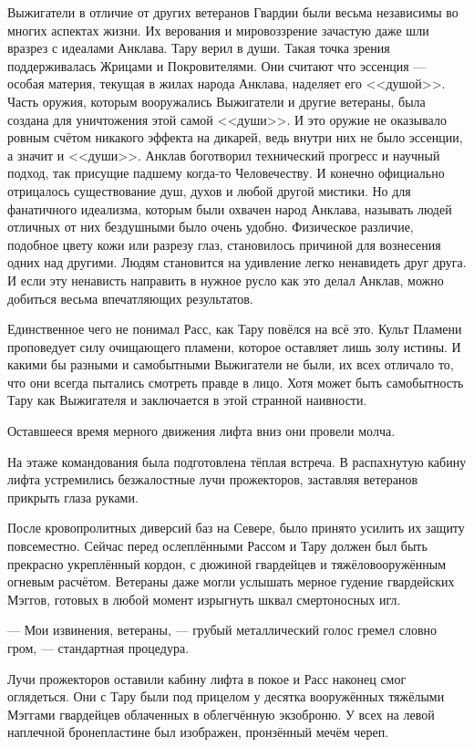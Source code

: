 Выжигатели в отличие от других ветеранов Гвардии были весьма независимы во 
многих аспектах жизни. Их верования и мировоззрение зачастую даже шли вразрез с 
идеалами Анклава. Тару верил в души. Такая точка зрения поддерживалась Жрицами и 
Покровителями. Они считают что эссенция --- особая материя, текущая в жилах 
народа Анклава, наделяет его <<душой>>. Часть оружия, которым вооружались 
Выжигатели и другие ветераны, была создана для уничтожения этой самой <<души>>. 
И это оружие не оказывало ровным счётом никакого эффекта на дикарей, ведь 
внутри них не было эссенции, а значит и <<души>>. Анклав боготворил технический 
прогресс и научный подход, так присущие падшему когда-то Человечеству. И 
конечно официально отрицалось существование душ, духов и любой другой мистики. 
Но для фанатичного идеализма, которым были охвачен народ Анклава, называть 
людей отличных от них бездушными было очень удобно. Физическое различие, 
подобное цвету кожи или разрезу глаз, становилось причиной для вознесения одних 
над другими. Людям становится на удивление легко ненавидеть друг друга. И если 
эту ненависть направить в нужное русло как это делал Анклав, можно добиться 
весьма впечатляющих результатов.

Единственное чего не понимал Расс, как Тару повёлся на всё это. Культ Пламени 
проповедует силу очищающего пламени, которое оставляет лишь золу истины. И 
какими бы разными и самобытными Выжигатели не были, их всех отличало то, что они 
всегда пытались смотреть правде в лицо. Хотя может быть самобытность Тару как 
Выжигателя и заключается в этой странной наивности.

Оставшееся время мерного движения лифта вниз они провели молча.

На этаже командования была подготовлена тёплая встреча. В распахнутую кабину 
лифта устремились безжалостные лучи прожекторов, заставляя ветеранов прикрыть 
глаза руками.

После кровопролитных диверсий баз на Севере, было принято усилить их защиту 
повсеместно. Сейчас перед ослеплёнными Рассом и Тару должен был быть прекрасно 
укреплённый кордон, с дюжиной гвардейцев и тяжёловооружённым огневым расчётом. 
Ветераны даже могли услышать мерное гудение гвардейских Мэггов, готовых в любой 
момент изрыгнуть шквал смертоносных игл.

\noindent --- Мои извинения, ветераны, --- грубый металлический голос гремел 
словно гром, --- стандартная процедура.

Лучи прожекторов оставили кабину лифта в покое и Расс наконец смог оглядеться. 
Они с Тару были под прицелом у десятка вооружённых тяжёлыми Мэггами гвардейцев 
облаченных в облегчённую экзоброню. У всех на левой наплечной бронепластине был 
изображен, пронзённый мечём череп.

